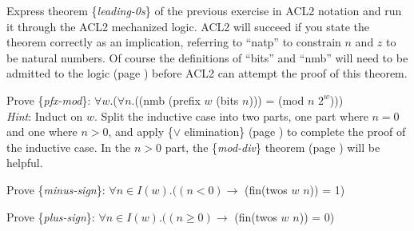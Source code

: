 \begin{ExerciseList}

\Exercise \label{leading-0s-defthm} Express theorem \{\emph{leading-0s}\}
of the previous exercise in ACL2 notation
and run it through the ACL2 mechanized logic.
ACL2 will succeed if you state the theorem correctly as an implication,
referring to ``natp'' to constrain $n$ and $z$ to be natural numbers.
Of course the definitions of ``bits'' and ``nmb'' will need to
be admitted to the logic (page \pageref{bits-defun})
before ACL2 can attempt the proof of this theorem.

\Exercise \label{pfx-mod} Prove \{\emph{pfx-mod}\}:
$\forall w$.($\forall n$.((nmb (prefix $w$ (bits $n$))) = (mod $n$ $2^w$))) \\
\emph{Hint}: Induct on $w$. Split the inductive case into two parts,
one part where $n = 0$ and one where $n > 0$, and apply
\{$\vee$ elimination\} (page \pageref{fig-02-deduction-rules}) to complete
the proof of the inductive case.
In the $n > 0$ part, the \{\emph{mod-div}\} theorem
(page \pageref{modular-division}) will be helpful.

\Exercise \label{minus-sign} Prove \{\emph{minus-sign}\}:
$\forall n \in I(w).((n < 0) \rightarrow$ (fin(twos $w$ $n$)) = 1)

\Exercise \label{plus-sign} Prove \{\emph{plus-sign}\}:
$\forall n \in I(w).((n \ge 0) \rightarrow$ (fin(twos $w$ $n$)) = 0)

\end{ExerciseList}

